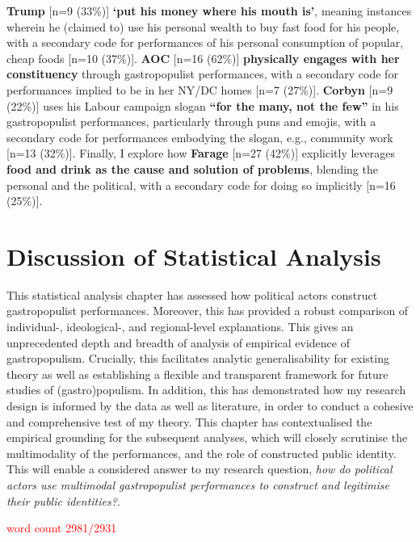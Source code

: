 \documentclass[a4paper, nobind]{templates/ociamthesis}
\begin{document}
\textbf{Trump} {[}n=9 (33\%){]} \textbf{`put his money where his mouth is'}, meaning instances wherein he (claimed to) use his personal wealth to buy fast food for his people, with a secondary code for performances of his personal consumption of popular, cheap foods {[}n=10 (37\%){]}. \textbf{AOC} {[}n=16 (62\%){]} \textbf{physically engages with her constituency} through gastropopulist performances, with a secondary code for performances implied to be in her NY/DC homes {[}n=7 (27\%){]}. \textbf{Corbyn} {[}n=9 (22\%){]} uses his Labour campaign slogan \textbf{``for the many, not the few''} in his gastropopulist performances, particularly through puns and emojis, with a secondary code for performances embodying the slogan, e.g., community work {[}n=13 (32\%){]}. Finally, I explore how \textbf{Farage} {[}n=27 (42\%){]} explicitly leverages \textbf{food and drink as the cause and solution of problems}, blending the personal and the political, with a secondary code for doing so implicitly {[}n=16 (25\%){]}.

\hypertarget{discussion-of-statistical-analysis}{%
\section*{Discussion of Statistical Analysis}\label{discussion-of-statistical-analysis}}

This statistical analysis chapter has assessed how political actors construct gastropopulist performances. Moreover, this has provided a robust comparison of individual-, ideological-, and regional-level explanations. This gives an unprecedented depth and breadth of analysis of empirical evidence of gastropopulism. Crucially, this facilitates analytic generalisability for existing theory as well as establishing a flexible and transparent framework for future studies of (gastro)populism. In addition, this has demonstrated how my research design is informed by the data as well as literature, in order to conduct a cohesive and comprehensive test of my theory. This chapter has contextualised the empirical grounding for the subsequent analyses, which will closely scrutinise the multimodality of the performances, and the role of constructed public identity. This will enable a considered answer to my research question, \emph{how do political actors use multimodal gastropopulist performances to construct and legitimise their public identities?}.

\textcolor{red}{word count 2981/2931}
\end{document}
